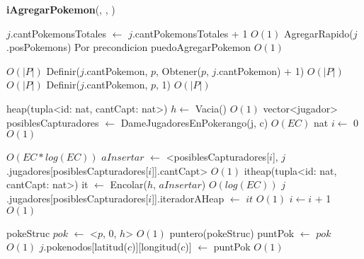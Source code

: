 \begin{Algoritmos}
\begin{algorithm}[H]
\begin{algorithmic}[1]
\end{algorithmic}
\end{algorithm}


\begin{algorithm}[H]
{\textbf{iAgregarPokemon}(, , )}
\begin{algorithmic}[1]

\State $j$.cantPokemonsTotales $\gets$ $j$.cantPokemonsTotales + 1 \Comment $O(1)$
\State AgregarRapido($j$.posPokemons) \Comment Por precondicion puedoAgregarPokemon $O(1)$

 \Comment $O(|P|)$
  \State Definir($j$.cantPokemon, $p$, Obtener($p$, $j$.cantPokemon) + 1) \Comment $O(|P|)$
\EndIf
{}  \Comment $O(|P|)$
  \State Definir($j$.cantPokemon, $p$, 1)  \Comment $O(|P|)$
\EndIf

\State heap(tupla<id: nat, cantCapt: nat>) $h \gets$ Vacia() \Comment $O(1)$
\State vector<jugador> \hspace{0.5mm} posiblesCapturadores $\gets$ DameJugadoresEnPokerango(j, c) \Comment $O(EC)$
\State nat $i \gets$ 0 \Comment $O(1)$

 \Comment $O(EC*log(EC))$
  \State $aInsertar$ $\gets$ <posiblesCapturadores[$i$], $j$.jugadores[posiblesCapturadores[$i$]].cantCapt> \Comment $O(1)$
  \State itheap(tupla<id: nat, cantCapt: nat>) it $\gets$ Encolar($h$, $aInsertar$) \Comment $O(log(EC))$
  \State $j$.jugadores[posiblesCapturadores[$i$]].iteradorAHeap $\gets$ $it$ \Comment $O(1)$
  \State $i \gets i$ + 1 \Comment $O(1)$
\EndWhile

\State pokeStruc $pok$ $\gets$ <$p$, 0, $h$> \Comment $O(1)$
\State puntero(pokeStruc) puntPok $\gets$ $pok$ \Comment $O(1)$
\State $j$.pokenodos[latitud($c$)][longitud($c$)] $\gets$ puntPok \Comment $O(1)$


\end{algorithmic}
\end{algorithm}
\end{Algoritmos}
